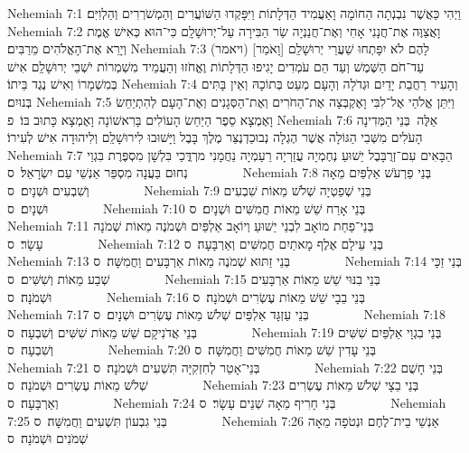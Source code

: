 Nehemiah 7:1	וַיְהִי כַּאֲשֶׁר נִבְנְתָה הַחוֹמָה וָאַעֲמִיד הַדְּלָתוֹת וַיִּפָּקְדוּ הַשּׁוֹעֲרִים וְהַמְשֹׁרְרִים וְהַלְוִיִּם׃
Nehemiah 7:2	וָאֲצַוֶּה אֶת־חֲנָנִי אָחִי וְאֶת־חֲנַנְיָה שַׂר הַבִּירָה עַל־יְרוּשָׁלָ͏ִם כִּי־הוּא כְּאִישׁ אֱמֶת וְיָרֵא אֶת־הָאֱלֹהִים מֵרַבִּים׃
Nehemiah 7:3	(ויאמר) [וָאֹמַר] לָהֶם לֹא יִפָּתְחוּ שַׁעֲרֵי יְרוּשָׁלַ͏ִם עַד־חֹם הַשֶּׁמֶשׁ וְעַד הֵם עֹמְדִים יָגִיפוּ הַדְּלָתוֹת וֶאֱחֹזוּ וְהַעֲמֵיד מִשְׁמְרוֹת יֹשְׁבֵי יְרוּשָׁלַ͏ִם אִישׁ בְּמִשְׁמָרוֹ וְאִישׁ נֶגֶד בֵּיתוֹ׃
Nehemiah 7:4	וְהָעִיר רַחֲבַת יָדַיִם וּגְדֹלָה וְהָעָם מְעַט בְּתוֹכָהּ וְאֵין בָּתִּים בְּנוּיִם׃
Nehemiah 7:5	וַיִּתֵּן אֱלֹהַי אֶל־לִבִּי וָאֶקְבְּצָה אֶת־הַחֹרִים וְאֶת־הַסְּגָנִים וְאֶת־הָעָם לְהִתְיַחֵשׂ וָאֶמְצָא סֵפֶר הַיַּחַשׂ הָעוֹלִים בָּרִאשׁוֹנָה וָאֶמְצָא כָּתוּב בּוֹ׃ {פ}
Nehemiah 7:6	אֵלֶּה  בְּנֵי הַמְּדִינָה הָעֹלִים מִשְּׁבִי הַגּוֹלָה אֲשֶׁר הֶגְלָה נְבוּכַדְנֶצַּר מֶלֶךְ בָּבֶל וַיָּשׁוּבוּ לִירוּשָׁלַ͏ִם וְלִיהוּדָה אִישׁ לְעִירוֹ׃
Nehemiah 7:7	הַבָּאִים עִם־זְרֻבָּבֶל יֵשׁוּעַ נְחֶמְיָה עֲזַרְיָה רַעַמְיָה נַחֲמָנִי מרְדֳּכַי בִּלְשָׁן מִסְפֶּרֶת בִּגְוַי נְחוּם בַּעֲנָה מִסְפַּר אַנְשֵׁי עַם יִשְׂרָאֵל׃ {ס}        
Nehemiah 7:8	בְּנֵי פַרְעֹשׁ אַלְפַּיִם מֵאָה וְשִׁבְעִים וּשְׁנָיִם׃ {ס}        
Nehemiah 7:9	בְּנֵי שְׁפַטְיָה שְׁלֹשׁ מֵאוֹת שִׁבְעִים וּשְׁנָיִם׃ {ס}        
Nehemiah 7:10	בְּנֵי אָרַח שֵׁשׁ מֵאוֹת חֲמִשִּׁים וּשְׁנָיִם׃ {ס}        
Nehemiah 7:11	בְּנֵי־פַחַת מוֹאָב לִבְנֵי יֵשׁוּעַ וְיוֹאָב אַלְפַּיִם וּשְׁמֹנֶה מֵאוֹת שְׁמֹנָה עָשָׂר׃ {ס}        
Nehemiah 7:12	בְּנֵי עֵילָם אֶלֶף מָאתַיִם חֲמִשִּׁים וְאַרְבָּעָה׃ {ס}        
Nehemiah 7:13	בְּנֵי זַתּוּא שְׁמֹנֶה מֵאוֹת אַרְבָּעִים וַחֲמִשָּׁה׃ {ס}        
Nehemiah 7:14	בְּנֵי זַכָּי שְׁבַע מֵאוֹת וְשִׁשִּׁים׃ {ס}        
Nehemiah 7:15	בְּנֵי בִנּוּי שֵׁשׁ מֵאוֹת אַרְבָּעִים וּשְׁמֹנָה׃ {ס}        
Nehemiah 7:16	בְּנֵי בֵבָי שֵׁשׁ מֵאוֹת עֶשְׂרִים וּשְׁמֹנָה׃ {ס}        
Nehemiah 7:17	בְּנֵי עַזְגָּד אַלְפַּיִם שְׁלֹשׁ מֵאוֹת עֶשְׂרִים וּשְׁנָיִם׃ {ס}        
Nehemiah 7:18	בְּנֵי אֲדֹנִיקָם שֵׁשׁ מֵאוֹת שִׁשִּׁים וְשִׁבְעָה׃ {ס}        
Nehemiah 7:19	בְּנֵי בִגְוָי אַלְפַּיִם שִׁשִּׁים וְשִׁבְעָה׃ {ס}        
Nehemiah 7:20	בְּנֵי עָדִין שֵׁשׁ מֵאוֹת חֲמִשִּׁים וַחֲמִשָּׁה׃ {ס}        
Nehemiah 7:21	בְּנֵי־אָטֵר לְחִזְקִיָּה תִּשְׁעִים וּשְׁמֹנָה׃ {ס}        
Nehemiah 7:22	בְּנֵי חָשֻׁם שְׁלֹשׁ מֵאוֹת עֶשְׂרִים וּשְׁמֹנָה׃ {ס}        
Nehemiah 7:23	בְּנֵי בֵצָי שְׁלֹשׁ מֵאוֹת עֶשְׂרִים וְאַרְבָּעָה׃ {ס}        
Nehemiah 7:24	בְּנֵי חָרִיף מֵאָה שְׁנֵים עָשָׂר׃ {ס}        
Nehemiah 7:25	בְּנֵי גִבְעוֹן תִּשְׁעִים וַחֲמִשָּׁה׃ {ס}        
Nehemiah 7:26	אַנְשֵׁי בֵית־לֶחֶם וּנְטֹפָה מֵאָה שְׁמֹנִים וּשְׁמֹנָה׃ {ס}        
